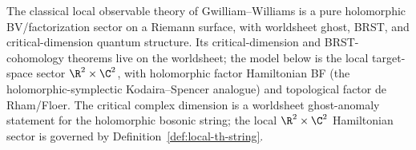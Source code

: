 \documentclass[11pt]{memoir}
\begin{document}
\begin{rmk}
  The classical local observable theory of Gwilliam--Williams is a
  pure holomorphic BV/factorization sector on a Riemann surface, with
  worldsheet ghost, BRST, and critical-dimension quantum structure.
  Its critical-dimension and BRST-cohomology theorems live on the
  worldsheet; the model below is the local target-space sector
  \(\R^2\times\C^2\), with holomorphic factor Hamiltonian BF (the
  holomorphic-symplectic Kodaira--Spencer analogue) and topological
  factor de Rham/Floer.  The critical complex dimension is a
  worldsheet ghost-anomaly statement for the holomorphic bosonic
  string; the local \(\R^2\times\C^2\) Hamiltonian sector is governed
  by Definition~\ref{def:local-th-string}.
\end{rmk}
\end{document}
